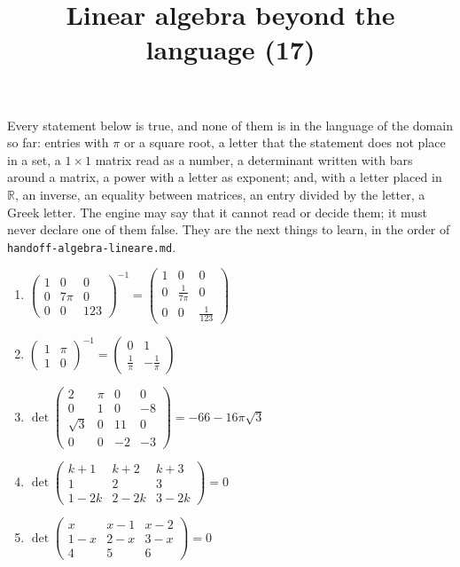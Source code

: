 \documentclass[11pt,a4paper]{article}
\title{Linear algebra beyond the language (17)}
\author{}
\date{}
\begin{document}
\maketitle
Every statement below is true, and none of them is in the language of the domain so far: entries with $\pi$ or a square root, a letter that the statement does not place in a set, a $1 \times 1$ matrix read as a number, a determinant written with bars around a matrix, a power with a letter as exponent; and, with a letter placed in $\mathbb{R}$, an inverse, an equality between matrices, an entry divided by the letter, a Greek letter. The engine may say that it cannot read or decide them; it must never declare one of them false. They are the next things to learn, in the order of \texttt{handoff-algebra-lineare.md}.

\begin{enumerate}
\item $\displaystyle \begin{pmatrix} 1 & 0 & 0 \\ 0 & 7\pi & 0 \\ 0 & 0 & 123 \end{pmatrix}^{-1} = \begin{pmatrix} 1 & 0 & 0 \\ 0 & \frac{1}{7\pi} & 0 \\ 0 & 0 & \frac{1}{123} \end{pmatrix}$
\item $\displaystyle \begin{pmatrix} 1 & \pi \\ 1 & 0 \end{pmatrix}^{-1} = \begin{pmatrix} 0 & 1 \\ \frac{1}{\pi} & -\frac{1}{\pi} \end{pmatrix}$
\item $\displaystyle \det \begin{pmatrix} 2 & \pi & 0 & 0 \\ 0 & 1 & 0 & -8 \\ \sqrt{3} & 0 & 11 & 0 \\ 0 & 0 & -2 & -3 \end{pmatrix} = -66 - 16\pi\sqrt{3}$
\item $\displaystyle \det \begin{pmatrix} k + 1 & k + 2 & k + 3 \\ 1 & 2 & 3 \\ 1 - 2k & 2 - 2k & 3 - 2k \end{pmatrix} = 0$
\item $\displaystyle \det \begin{pmatrix} x & x - 1 & x - 2 \\ 1 - x & 2 - x & 3 - x \\ 4 & 5 & 6 \end{pmatrix} = 0$

\end{enumerate}
\end{document}

